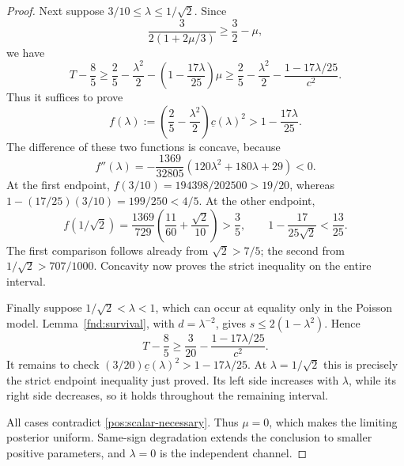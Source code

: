 \begin{proof}
Next suppose \(3/10\le\lambda\le1/\sqrt2\). Since
\[
 \frac{3}{2(1+2\mu/3)}\ge\frac32-\mu,
\]
we have
\[
 T-\frac85\ge\frac25-\frac{\lambda^2}{2}
             -\left(1-\frac{17\lambda}{25}\right)\mu
 \ge\frac25-\frac{\lambda^2}{2}
             -\frac{1-17\lambda/25}{c^2}.
\]
Thus it suffices to prove
\[
 f(\lambda):=\left(\frac25-\frac{\lambda^2}{2}\right)
                \underline c(\lambda)^2
 >1-\frac{17\lambda}{25}.
\]
The difference of these two functions is concave, because
\[
 f''(\lambda)=-\frac{1369}{32805}
                   (120\lambda^2+180\lambda+29)<0.
\]
At the first endpoint,
\(f(3/10)=194398/202500>19/20\), whereas
\(1-(17/25)(3/10)=199/250<4/5\). At the other endpoint,
\[
 f(1/\sqrt2)=\frac{1369}{729}
                 \left(\frac{11}{60}+\frac{\sqrt2}{10}\right)
 >\frac35,
 \qquad
 1-\frac{17}{25\sqrt2}<\frac{13}{25}.
\]
The first comparison follows already from \(\sqrt2>7/5\); the second
from \(1/\sqrt2>707/1000\). Concavity now proves the strict inequality
on the entire interval.

Finally suppose \(1/\sqrt2<\lambda<1\), which can occur at equality
only in the Poisson model. Lemma~\ref{fnd:survival}, with
\(d=\lambda^{-2}\), gives \(s\le2(1-\lambda^2)\). Hence
\[
 T-\frac85\ge\frac3{20}
                  -\frac{1-17\lambda/25}{c^2}.
\]
It remains to check
\((3/20)\underline c(\lambda)^2>1-17\lambda/25\).
At \(\lambda=1/\sqrt2\) this is precisely the strict endpoint
inequality just proved. Its left side increases with \(\lambda\), while
its right side decreases, so it holds throughout the remaining interval.

All cases contradict \eqref{pos:scalar-necessary}. Thus \(\mu=0\),
which makes the limiting posterior uniform. Same-sign degradation
extends the conclusion to smaller positive parameters, and
\(\lambda=0\) is the independent channel.
\end{proof}
